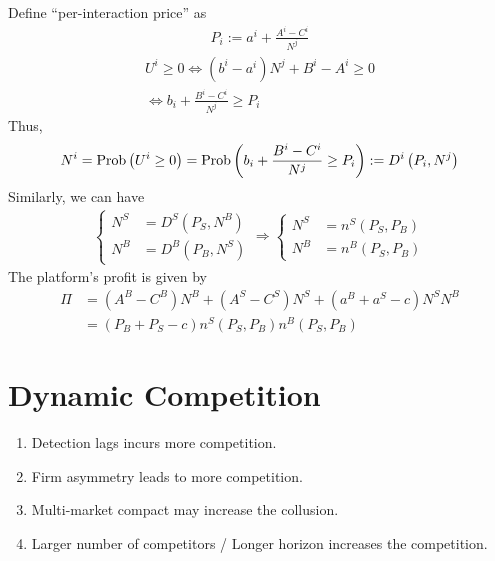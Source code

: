 \documentclass[11pt]{elegantbook}
\begin{document}
Define ``per-interaction price'' as
\begin{equation}
    \begin{aligned}
        P_i:=a^i+\frac{A^i-C^i}{N^j}
    \end{aligned}
    \nonumber
\end{equation}
\begin{equation}
    \begin{aligned}
        U^i\geq 0\Leftrightarrow (b^i-a^i)N^j+B^i-A^i\geq 0\\
        \Leftrightarrow b_i+\frac{B^i-C^i}{N^j}\geq P_i
    \end{aligned}
    \nonumber
\end{equation}
Thus,
\begin{equation}
    \begin{aligned}
        N^i=\textnormal{Prob}\left(U^i\geq 0\right)=\textnormal{Prob}\left(b_i+\frac{B^i-C^i}{N^j}\geq P_i\right):=D^i\left(P_i,N^j\right)
    \end{aligned}
    \nonumber
\end{equation}
Similarly, we can have
\begin{equation}
    \begin{aligned}
        \left\{\begin{matrix}
            N^S&=D^S\left(P_S,N^B\right)\\
            N^B&=D^B\left(P_B,N^S\right)
        \end{matrix}\right. \Rightarrow \left\{\begin{matrix}
            N^S&=n^S\left(P_S,P_B\right)\\
            N^B&=n^B\left(P_S,P_B\right)
        \end{matrix}\right.
    \end{aligned}
    \nonumber
\end{equation}
The platform's profit is given by
\begin{equation}
    \begin{aligned}
        \Pi&=\left(A^B-C^B\right)N^B+\left(A^S-C^S\right)N^S+(a^B+a^S-c)N^SN^B\\
        &=\left(P_B+P_S-c\right)n^S\left(P_S,P_B\right)n^B\left(P_S,P_B\right)
    \end{aligned}
    \nonumber
\end{equation}

\section{Dynamic Competition}
\begin{enumerate}
    \item Detection lags incurs more competition.
    \item Firm asymmetry leads to more competition.
    \item Multi-market compact may increase the collusion.
    \item Larger number of competitors / Longer horizon increases the competition.
\end{enumerate}
\end{document}
